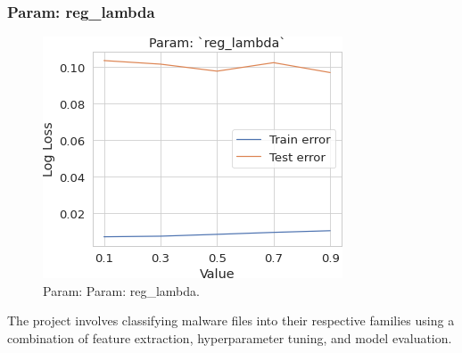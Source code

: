 \documentclass[conference]{IEEEtran}
\begin{document}
\subsubsection{Param: reg\_lambda}
\begin{figure}[H]
    \centerline{\includegraphics[width=0.7\linewidth]{fig14}}
    \caption{Param: Param: reg\_lambda.}
    \label{fig14}
\end{figure}

The project involves classifying malware files into their respective families using a combination of feature extraction, hyperparameter tuning, and model evaluation. 
\end{document}
